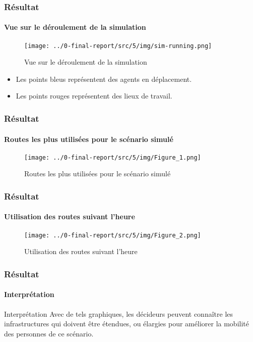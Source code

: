 \begin{frame}
    \frametitle{Résultat}
    \framesubtitle{Vue sur le déroulement de la simulation}


    \begin{figure}[H]
        \centering
        \texttt{[image: ../0-final-report/src/5/img/sim-running.png]}
        \caption{Vue sur le déroulement de la simulation}
        \label{fig:simulateur-running}
    \end{figure}
    \begin{itemize}
        \item Les points bleus représentent des agents en déplacement.
        \item Les points rouges représentent des lieux de travail.
    \end{itemize}
\end{frame}

\begin{frame}
    \frametitle{Résultat}
    \framesubtitle{Routes les plus utilisées pour le scénario simulé}

    \begin{figure}[h]
        \centering
        \texttt{[image: ../0-final-report/src/5/img/Figure\_1.png]}
        \caption{Routes les plus utilisées pour le scénario simulé}
        \label{fig:top_used_road}
    \end{figure}

\end{frame}

\begin{frame}
    \frametitle{Résultat}
    \framesubtitle{Utilisation des routes suivant l'heure}

    \begin{figure}[h]
        \centering
        \texttt{[image: ../0-final-report/src/5/img/Figure\_2.png]}
        \caption{Utilisation des routes suivant l'heure}
        \label{fig:road_usage_hour}
    \end{figure}

\end{frame}

\begin{frame}
    \frametitle{Résultat}
    \framesubtitle{Interprétation}

    \begin{block}{Interprétation}
        Avec de tels graphiques, les décideurs peuvent connaître les infrastructures qui doivent être étendues, ou élargies pour améliorer la mobilité des personnes de ce scénario.
    \end{block}
\end{frame}

